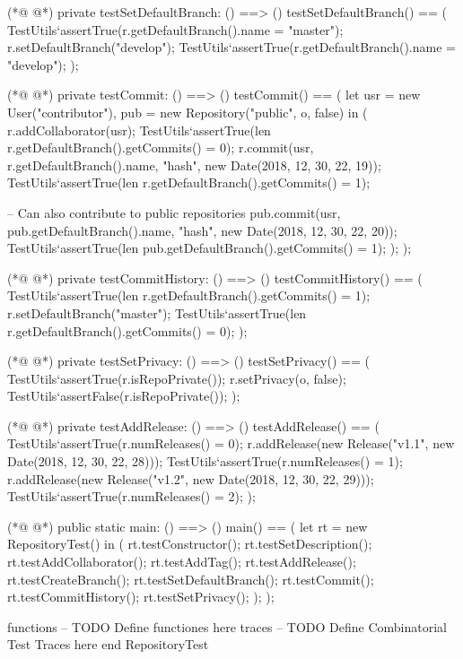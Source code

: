 \begin{vdmpp}[breaklines=true]
(*@
\label{testSetDefaultBranch:71}
@*)
 private testSetDefaultBranch: () ==> ()
 testSetDefaultBranch() == (
  TestUtils`assertTrue(r.getDefaultBranch().name = "master");
  r.setDefaultBranch("develop");
  TestUtils`assertTrue(r.getDefaultBranch().name = "develop");
 );
 
(*@
\label{testCommit:78}
@*)
 private testCommit: () ==> ()
 testCommit() == (
  let usr = new User("contributor"), pub = new Repository("public", o, false) in (
   r.addCollaborator(usr);
   TestUtils`assertTrue(len r.getDefaultBranch().getCommits() = 0);
   r.commit(usr, r.getDefaultBranch().name, "hash", new Date(2018, 12, 30, 22, 19));
   TestUtils`assertTrue(len r.getDefaultBranch().getCommits() = 1);
   
   -- Can also contribute to public repositories
   pub.commit(usr, pub.getDefaultBranch().name, "hash", new Date(2018, 12, 30, 22, 20));
   TestUtils`assertTrue(len pub.getDefaultBranch().getCommits() = 1);
  );
 );
 
(*@
\label{testCommitHistory:92}
@*)
 private testCommitHistory: () ==> ()
 testCommitHistory() == (
  TestUtils`assertTrue(len r.getDefaultBranch().getCommits() = 1);
  r.setDefaultBranch("master");
  TestUtils`assertTrue(len r.getDefaultBranch().getCommits() = 0);
 );
 
(*@
\label{testSetPrivacy:99}
@*)
 private testSetPrivacy: () ==> ()
 testSetPrivacy() == (
  TestUtils`assertTrue(r.isRepoPrivate());
  r.setPrivacy(o, false);
  TestUtils`assertFalse(r.isRepoPrivate());
 );
 
(*@
\label{testAddRelease:106}
@*)
 private testAddRelease: () ==> ()
  testAddRelease() ==
  (
   TestUtils`assertTrue(r.numReleases() = 0);
   r.addRelease(new Release("v1.1", new Date(2018, 12, 30, 22, 28)));
   TestUtils`assertTrue(r.numReleases() = 1);
   r.addRelease(new Release("v1.2", new Date(2018, 12, 30, 22, 29)));
   TestUtils`assertTrue(r.numReleases() = 2);
  );
 
(*@
\label{main:116}
@*)
 public static main: () ==> ()
 main() == (
  let rt = new RepositoryTest() in (
   rt.testConstructor();
   rt.testSetDescription();
   rt.testAddCollaborator();
   rt.testAddTag();
   rt.testAddRelease();
   rt.testCreateBranch();
   rt.testSetDefaultBranch();
   rt.testCommit();
   rt.testCommitHistory();
   rt.testSetPrivacy();
  );
 );

functions
-- TODO Define functiones here
traces
-- TODO Define Combinatorial Test Traces here
end RepositoryTest
\end{vdmpp}
\bigskip
